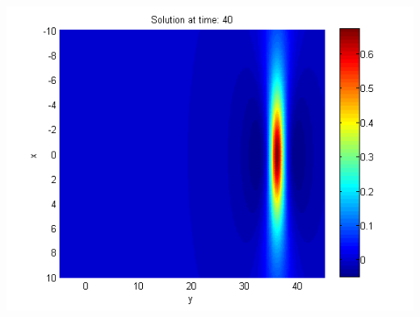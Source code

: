 \documentclass[a0,portrait]{a0poster}
\begin{document}
\begin{multicols}{2}
\begin{center}
\begin{minipage}[b]{0.30\linewidth}
	\end{minipage}
	\begin{minipage}[b]{0.30\linewidth}
		 \includegraphics[width=\linewidth]{figures/Solution1_t=40.png}
	\end{minipage}
\end{center}


\end{multicols}
\end{document}
